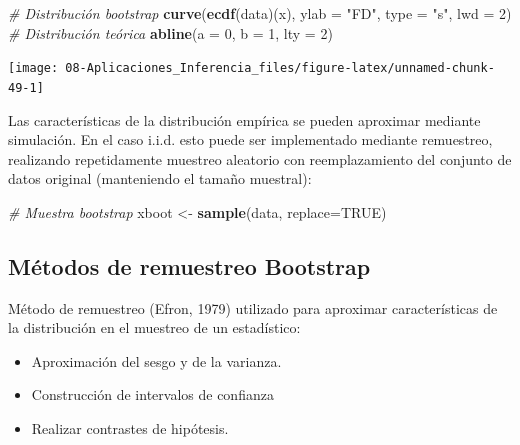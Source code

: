\documentclass[
]{book}
\newenvironment{Shaded}{\begin{snugshade}}{\end{snugshade}}
\newcommand{\CommentTok}[1]{\textcolor[rgb]{0.56,0.35,0.01}{\textit{#1}}}
\newcommand{\DataTypeTok}[1]{\textcolor[rgb]{0.13,0.29,0.53}{#1}}
\newcommand{\DecValTok}[1]{\textcolor[rgb]{0.00,0.00,0.81}{#1}}
\newcommand{\KeywordTok}[1]{\textcolor[rgb]{0.13,0.29,0.53}{\textbf{#1}}}
\newcommand{\NormalTok}[1]{#1}
\newcommand{\OtherTok}[1]{\textcolor[rgb]{0.56,0.35,0.01}{#1}}
\newcommand{\StringTok}[1]{\textcolor[rgb]{0.31,0.60,0.02}{#1}}
\theoremstyle{break}
\theoremstyle{definition}
\theoremstyle{definition}
\theoremstyle{definition}
\theoremstyle{remark}
\begin{document}
\begin{Shaded}
\begin{Highlighting}[]
 \CommentTok{# Distribución bootstrap}
\KeywordTok{curve}\NormalTok{(}\KeywordTok{ecdf}\NormalTok{(data)(x), }\DataTypeTok{ylab =} \StringTok{"FD"}\NormalTok{, }\DataTypeTok{type =} \StringTok{"s"}\NormalTok{, }\DataTypeTok{lwd =} \DecValTok{2}\NormalTok{)}
\CommentTok{# Distribución teórica}
\KeywordTok{abline}\NormalTok{(}\DataTypeTok{a =} \DecValTok{0}\NormalTok{, }\DataTypeTok{b =} \DecValTok{1}\NormalTok{, }\DataTypeTok{lty =} \DecValTok{2}\NormalTok{) }
\end{Highlighting}
\end{Shaded}

\begin{center}\texttt{[image: 08-Aplicaciones\_Inferencia\_files/figure-latex/unnamed-chunk-49-1]} \end{center}

Las características de la distribución empírica se pueden aproximar mediante simulación.
En el caso i.i.d. esto puede ser implementado mediante remuestreo,
realizando repetidamente muestreo aleatorio con reemplazamiento
del conjunto de datos original (manteniendo el tamaño muestral):

\begin{Shaded}
\begin{Highlighting}[]
 \CommentTok{# Muestra bootstrap}
\NormalTok{xboot <-}\StringTok{ }\KeywordTok{sample}\NormalTok{(data, }\DataTypeTok{replace=}\OtherTok{TRUE}\NormalTok{)}
\end{Highlighting}
\end{Shaded}

\hypertarget{muxe9todos-de-remuestreo-bootstrap}{%
\subsection{Métodos de remuestreo Bootstrap}\label{muxe9todos-de-remuestreo-bootstrap}}

Método de remuestreo (Efron, 1979) utilizado para aproximar
características de la distribución en el muestreo de un estadístico:

\begin{itemize}
\item
  Aproximación del sesgo y de la varianza.
\item
  Construcción de intervalos de confianza
\item
  Realizar contrastes de hipótesis.
\end{itemize}
\end{document}
